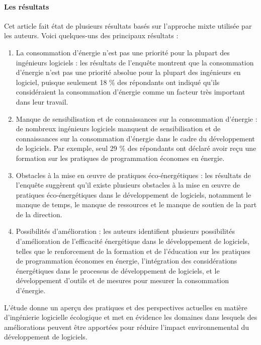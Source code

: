 \paragraph{Les résultats}
Cet article fait état de plusieurs résultats basés sur l'approche mixte utilisée par les auteurs. Voici quelques-uns des principaux résultats :
\begin{enumerate}
    \item La consommation d'énergie n'est pas une priorité pour la plupart des ingénieurs logiciels : les résultats de l'enquête montrent que la consommation d'énergie n'est pas une priorité absolue pour la plupart des ingénieurs en logiciel, puisque seulement 18 \% des répondants ont indiqué qu'ils considéraient la consommation d'énergie comme un facteur très important dans leur travail.
    \item Manque de sensibilisation et de connaissances sur la consommation d'énergie : de nombreux ingénieurs logiciels manquent de sensibilisation et de connaissances sur la consommation d'énergie dans le cadre du développement de logiciels. Par exemple, seul 29 \% des répondants ont déclaré avoir reçu une formation sur les pratiques de programmation économes en énergie.
    \item Obstacles à la mise en œuvre de pratiques éco-énergétiques : les résultats de l'enquête suggèrent qu'il existe plusieurs obstacles à la mise en œuvre de pratiques éco-énergétiques dans le développement de logiciels, notamment le manque de temps, le manque de ressources et le manque de soutien de la part de la direction.
    \item Possibilités d'amélioration : les auteurs identifient plusieurs possibilités d'amélioration de l'efficacité énergétique dans le développement de logiciels, telles que le renforcement de la formation et de l'éducation sur les pratiques de programmation économes en énergie, l'intégration des considérations énergétiques dans le processus de développement de logiciels, et le développement d'outils et de mesures pour mesurer la consommation d'énergie.
\end{enumerate}
L'étude donne un aperçu des pratiques et des perspectives actuelles en matière d'ingénierie logicielle écologique et met en évidence les domaines dans lesquels des améliorations peuvent être apportées pour réduire l'impact environnemental du développement de logiciels.

